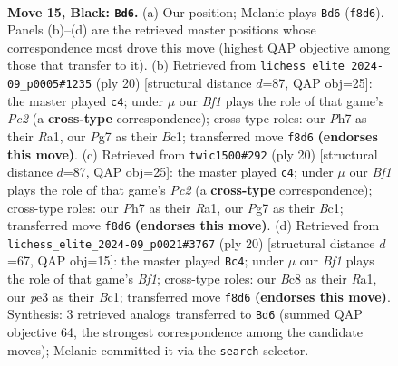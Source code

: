 \documentclass[11pt]{article}
\begin{document}
\clearpage

\begin{figure}[p]\centering
\begin{subfigure}{0.46\textwidth}\centering
\resizebox{\linewidth}{!}{%
\newchessgame
\chessboard[
  setfen={r1b1kb1r/ppq3pp/2p5/3pNp2/3P4/1Q2P3/PP3PPP/1RB1K2R b K - 1 15},
  showmover=false,
  pgfstyle=straightmove, color=movearrow, markmove={f8-d6}
]}
\caption{}
\end{subfigure}\hfill
\begin{subfigure}{0.46\textwidth}\centering
\resizebox{\linewidth}{!}{%
\newchessgame
\chessboard[
  setfen={r1b1k2r/p2pbppp/1qp1p3/3nP3/4NP2/P7/1PP3PP/R1BQKB1R w KQkq - 1 11},
  showmover=false,
  pgfstyle=straightmove, color=movearrow, markmove={c2-c4}
]}
\caption{}
\end{subfigure}
\\[4pt]
\begin{subfigure}{0.46\textwidth}\centering
\resizebox{\linewidth}{!}{%
\newchessgame
\chessboard[
  setfen={r1b1k2r/p2pbppp/1qp1p3/3nP3/4NP2/P7/1PP3PP/R1BQKB1R w KQkq - 1 11},
  showmover=false,
  pgfstyle=straightmove, color=movearrow, markmove={c2-c4}
]}
\caption{}
\end{subfigure}\hfill
\begin{subfigure}{0.46\textwidth}\centering
\resizebox{\linewidth}{!}{%
\newchessgame
\chessboard[
  setfen={rn2kb1r/pp3ppp/1qp2p2/8/8/1Q5P/PPP2PP1/R1B1KB1R w KQkq - 2 11},
  showmover=false,
  pgfstyle=straightmove, color=movearrow, markmove={f1-c4}
]}
\caption{}
\end{subfigure}
\caption{\textbf{Move 15, Black: \texttt{Bd6}.} (a) Our position; Melanie plays \texttt{Bd6} (\texttt{f8d6}). Panels (b)--(d) are the retrieved master positions whose correspondence most drove this move (highest QAP objective among those that transfer to it). (b) Retrieved from \texttt{lichess\_elite\_2024-09\_p0005\#1235} (ply 20) [structural distance $d$=87, QAP obj=25]: the master played \texttt{c4}; under $\mu$ our \emph{Bf1} plays the role of that game's \emph{Pc2} (a \textbf{cross-type} correspondence); cross-type roles: our \emph{P}h7 as their \emph{R}a1, our \emph{P}g7 as their \emph{B}c1; transferred move \texttt{f8d6} \textbf{(endorses this move)}. (c) Retrieved from \texttt{twic1500\#292} (ply 20) [structural distance $d$=87, QAP obj=25]: the master played \texttt{c4}; under $\mu$ our \emph{Bf1} plays the role of that game's \emph{Pc2} (a \textbf{cross-type} correspondence); cross-type roles: our \emph{P}h7 as their \emph{R}a1, our \emph{P}g7 as their \emph{B}c1; transferred move \texttt{f8d6} \textbf{(endorses this move)}. (d) Retrieved from \texttt{lichess\_elite\_2024-09\_p0021\#3767} (ply 20) [structural distance $d$=67, QAP obj=15]: the master played \texttt{Bc4}; under $\mu$ our \emph{Bf1} plays the role of that game's \emph{Bf1}; cross-type roles: our \emph{B}c8 as their \emph{R}a1, our \emph{p}e3 as their \emph{B}c1; transferred move \texttt{f8d6} \textbf{(endorses this move)}. Synthesis: 3 retrieved analogs transferred to \texttt{Bd6} (summed QAP objective 64, the strongest correspondence among the candidate moves); Melanie committed it via the \texttt{search} selector.}
\label{fig:thought-m29}
\end{figure}
\end{document}
